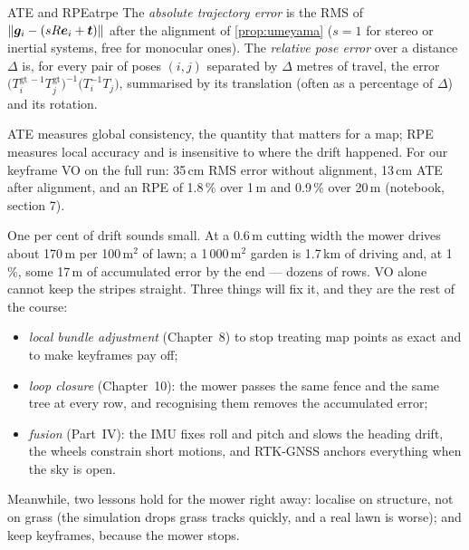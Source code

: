 \begin{definition}{ATE and RPE}{atrpe}
The \emph{absolute trajectory error} is the RMS of $\left\lVert \bm{g}_i-(s
R\bm{e}_i+\bm{t})\right\rVert$ after the alignment of \cref{prop:umeyama}
($s=1$ for stereo or inertial systems, free for monocular ones). The
\emph{relative pose error} over a distance $\Delta$ is, for every pair of
poses $(i,j)$ separated by $\Delta$ metres of travel, the error
$\bigl(T^{\mathrm{gt}\,-1}_iT^{\mathrm{gt}}_j\bigr)^{-1}\bigl(T^{-1}_i
T_j\bigr)$, summarised by its translation (often as a percentage of
$\Delta$) and its rotation.
\end{definition}

ATE measures global consistency, the quantity that matters for a map;
RPE measures local accuracy and is insensitive to where the drift
happened. For our keyframe VO on the full run: 35\,cm RMS error without
alignment, 13\,cm ATE after alignment, and an RPE of 1.8\,\% over 1\,m
and 0.9\,\% over 20\,m (notebook, section 7).

\begin{mower}
One per cent of drift sounds small. At a 0.6\,m cutting width the mower
drives about 170\,m per 100\,m$^2$ of lawn; a 1\,000\,m$^2$ garden is
1.7\,km of driving and, at 1\,\%, some 17\,m of accumulated error by
the end --- dozens of rows. VO alone cannot keep the stripes straight.
Three things will fix it, and they are the rest of the course:
\begin{itemize}[nosep]
\item \emph{local bundle adjustment} (Chapter~8) to stop treating map
  points as exact and to make keyframes pay off;
\item \emph{loop closure} (Chapter~10): the mower passes the same fence
  and the same tree at every row, and recognising them removes the
  accumulated error;
\item \emph{fusion} (Part~IV): the IMU fixes roll and pitch and slows the
  heading drift, the wheels constrain short motions, and RTK-GNSS anchors
  everything when the sky is open.
\end{itemize}
Meanwhile, two lessons hold for the mower right away: localise on
structure, not on grass (the simulation drops grass tracks quickly, and
a real lawn is worse); and keep keyframes, because the mower stops.
\end{mower}

